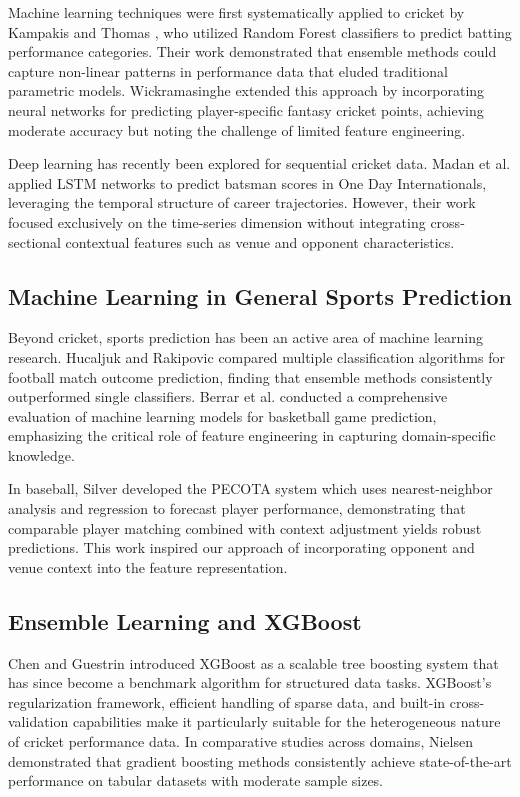 \documentclass[conference]{IEEEtran}
\begin{document}
Machine learning techniques were first systematically applied to cricket by Kampakis and Thomas \cite{ref3}, who utilized Random Forest classifiers to predict batting performance categories. Their work demonstrated that ensemble methods could capture non-linear patterns in performance data that eluded traditional parametric models. Wickramasinghe \cite{ref4} extended this approach by incorporating neural networks for predicting player-specific fantasy cricket points, achieving moderate accuracy but noting the challenge of limited feature engineering.

Deep learning has recently been explored for sequential cricket data. Madan et al. \cite{ref5} applied LSTM networks to predict batsman scores in One Day Internationals, leveraging the temporal structure of career trajectories. However, their work focused exclusively on the time-series dimension without integrating cross-sectional contextual features such as venue and opponent characteristics.

\subsection{Machine Learning in General Sports Prediction}
Beyond cricket, sports prediction has been an active area of machine learning research. Hucaljuk and Rakipovic \cite{ref6} compared multiple classification algorithms for football match outcome prediction, finding that ensemble methods consistently outperformed single classifiers. Berrar et al. \cite{ref7} conducted a comprehensive evaluation of machine learning models for basketball game prediction, emphasizing the critical role of feature engineering in capturing domain-specific knowledge.

In baseball, Silver \cite{ref8} developed the PECOTA system which uses nearest-neighbor analysis and regression to forecast player performance, demonstrating that comparable player matching combined with context adjustment yields robust predictions. This work inspired our approach of incorporating opponent and venue context into the feature representation.

\subsection{Ensemble Learning and XGBoost}
Chen and Guestrin \cite{ref9} introduced XGBoost as a scalable tree boosting system that has since become a benchmark algorithm for structured data tasks. XGBoost's regularization framework, efficient handling of sparse data, and built-in cross-validation capabilities make it particularly suitable for the heterogeneous nature of cricket performance data. In comparative studies across domains, Nielsen \cite{ref10} demonstrated that gradient boosting methods consistently achieve state-of-the-art performance on tabular datasets with moderate sample sizes.
\end{document}
